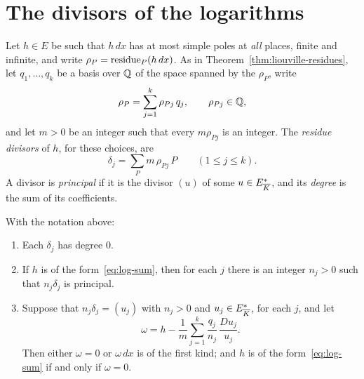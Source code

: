\section{The divisors of the logarithms}\label{sec:log-divisors}

Let $h \in E$ be such that $h\,dx$ has at most simple poles at \emph{all}
places, finite and infinite, and write $\rho_P = \operatorname{residue}_P(h\,dx)$. As in
Theorem~\ref{thm:liouville-residues}, let $q_1, \dots, q_k$ be a basis over
$\mathbb{Q}$ of the space spanned by the $\rho_P$, write
\[
  \rho_P = \sum_{j=1}^k \rho_{Pj}\, q_j, \qquad \rho_{Pj} \in \mathbb{Q} ,
\]
and let $m > 0$ be an integer such that every $m \rho_{Pj}$ is an integer.
The \emph{residue divisors} of $h$, for these choices, are
\begin{equation}\label{eq:delta}
  \delta_j = \sum_P m\, \rho_{Pj}\, P \qquad (1 \le j \le k).
\end{equation}
A divisor is \emph{principal} if it is the divisor $(u)$ of some $u \in
E_{\overline{K}}^*$, and its \emph{degree} is the sum of its coefficients.

\begin{theorem}[Trager]\label{thm:log-part}
With the notation above:
\begin{enumerate}[label=\textup{(\roman*)}]
\item Each $\delta_j$ has degree $0$.
\item If $h$ is of the form~\eqref{eq:log-sum}, then for each $j$ there is an
  integer $n_j > 0$ such that $n_j \delta_j$ is principal.
\item Suppose that $n_j \delta_j = (u_j)$ with $n_j > 0$ and $u_j \in
  E_{\overline{K}}^*$, for each $j$, and let
  \[
    \omega = h - \frac{1}{m} \sum_{j=1}^k \frac{q_j}{n_j}\, \frac{Du_j}{u_j} .
  \]
  Then either $\omega = 0$ or $\omega\,dx$ is of the first kind; and $h$ is of
  the form~\eqref{eq:log-sum} if and only if $\omega = 0$.
\end{enumerate}
\end{theorem}

